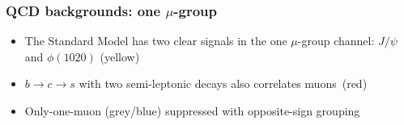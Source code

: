 \documentclass[compress]{beamer}
\begin{document}
\begin{frame}
\frametitle{QCD backgrounds: one $\mu$-group}

\begin{itemize}
\item The Standard Model has two clear signals in the one $\mu$-group
  channel: $J/\psi$ and $\phi(1020)$ (yellow)
\item $b \to c \to s$ with two semi-leptonic decays also correlates \mbox{muons (red)\hspace{-1 cm}}
\item<2> Only-one-muon (grey/blue) suppressed with
  opposite-sign grouping
\end{itemize}

\end{frame}
\end{document}
